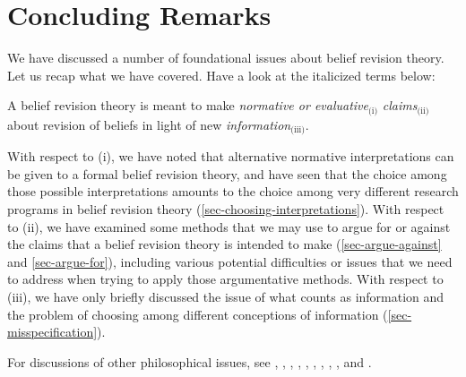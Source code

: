 


\section{Concluding Remarks}\label{lin-conclusion}

We have discussed a number of foundational issues about belief revision theory. Let us recap what we have covered. Have a look at the italicized terms below: \op

	\xm A belief revision theory is meant to make \textit{normative or evaluative}$_\text{(i)}$ \textit{claims}$_\text{(ii)}$ about revision of beliefs in light of new \textit{information}$_\text{(iii)}$.

\ed With respect to (i), we have noted that alternative normative interpretations can be given to a formal belief revision theory, and have seen that the choice among those possible interpretations amounts to the choice among very different research programs in belief revision theory (\autoref{sec-choosing-interpretations}). With respect to (ii), we have examined some methods that we may use to argue for or against the claims that a belief revision theory is intended to make (\autoref{sec-argue-against} and \autoref{sec-argue-for}), including various potential difficulties or issues that we need to address when trying to apply those argumentative methods. With respect to (iii), we have only briefly discussed the issue of what counts as information and the problem of choosing among different conceptions of information (\autoref{sec-misspecification}). 


For discussions of other philosophical issues, see \citet{levi1983enterprise}, \citet{levi1991fixation}, \citet{levi2004mild}, \citet{gardenfors1988knowledge}, \citet{rott2000two}, \citet{rott2001change}, \citet{hansson1999textbook}, \citet{hansson2003ten}, \citet{gillies2004epistemic}, and \citet{genin2015theory}. 


